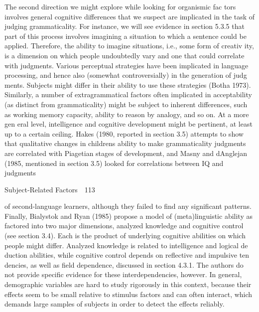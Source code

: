 \begin{styleTextbody}
The second direction we might explore while looking for organismic fac\- tors involves general cognitive differences that we suspect are implicated in the task of judging grammaticality. For instance, we will see evidence in section 5.3.5 that part of this process involves imagining a situation to which a sentence could be applied. Therefore, the ability to imagine situations, i.e., some form of creativ\- ity, is a dimension on which people undoubtedly vary and one that could correlate with judgments. Various perceptual strategies have been implicated in language processing, and hence also (somewhat controversially) in the generation of judg\- ments. Subjects might differ in their ability to use these strategies (Botha 1973). Similarly, a number of extragrammatical factors often implicated in acceptability (as distinct from grammaticality) might be subject to inherent differences, such as working memory capacity, ability to reason by analogy, and so on. At a more gen\- eral level, intelligence and cognitive development might be pertinent, at least up to a certain ceiling. Hakes (1980, reported in section 3.5) attempts to show that qualitative changes in children{\textquotesingle}s ability to make grammaticality judgments are correlated with Piagetian stages of development, and Masny and d{\textquotesingle}Anglejan (1985, mentioned in section 3.5) looked for correlations between IQ and judgments
\end{styleTextbody}


\clearpage\setcounter{page}{1}\begin{styleStandard}
Subject-Related Factors\ \ 113
\end{styleStandard}


\begin{styleStandard}
of second-language learners, although they failed to find any significant patterns. Finally, Bialystok and Ryan (1985) propose a model of (meta)linguistic ability as factored into two major dimensions, analyzed knowledge and cognitive control (see section 3.4). Each is the product of underlying cognitive abilities on which people might differ. Analyzed knowledge is related to intelligence and logical de\- duction abilities, while cognitive control depends on reflective and impulsive ten\- dencies, as well as field dependence, discussed in section 4.3.1. The authors do not provide specific evidence for these interdependencies, however. In general, demographic variables are hard to study rigorously in this context, because their effects seem to be small relative to stimulus factors and can often interact, which demands large samples of subjects in order to detect the effects reliably.
\end{styleStandard}


